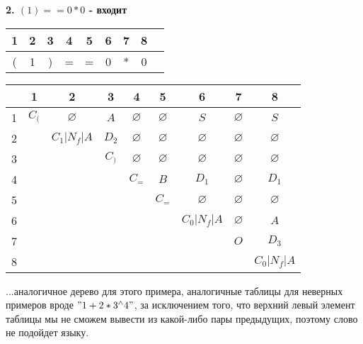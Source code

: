 \documentclass[12pt,a4paper]{article}%
\begin{document}
\begin{center}
\textbf{2. $(1) == 0 * 0$ - входит} \bigskip

\begin{tabular}{c|c|c|c|c|c|c|c|c}
  1&2 & 3 & 4 & 5 & 6 & 7 & 8 \\ \hline
  (&1&)&=&=&0&*&0 
\end{tabular}\bigskip

\begin{tabular}{c || c | c | c | c | c | c | c | c | }
    &1    &2    &3    &4    &5    &6    &7    &8    \\  \hline \hline
  1 &$C_($&$\varnothing$&$A$&$\varnothing$&$\varnothing$&$S$&$\varnothing$&$S$ \\ \hline
  2 &&$C_1|N_f|A$&$D_2$&$\varnothing$&$\varnothing$&$\varnothing$&$\varnothing$&$\varnothing$ \\ \hline
  3 &&&$C_)$&$\varnothing$&$\varnothing$&$\varnothing$&$\varnothing$&$\varnothing$ \\ \hline
  4 &&&&$C_=$&$B$&$D_1$&$\varnothing$&$D_1$ \\ \hline
  5 &&&&&$C_=$&$\varnothing$&$\varnothing$&$\varnothing$ \\ \hline
  6 &&&&&&$C_0|N_f|A$&$\varnothing$&$A$ \\ \hline
  7 &&&&&&&$O$&$D_3$ \\ \hline
  8 &&&&&&&&$C_0|N_f|A$\\ \hline
\end{tabular}
\end{center}
\bigskip
  
...аналогичное дерево для этого примера, аналогичные таблицы для неверных примеров вроде $"1+2*3^\land4"$, за исключением 
того, что верхний левый элемент таблицы мы не сможем вывести из какой-либо пары предыдущих, поэтому слово не подойдет языку.
\end{document}
